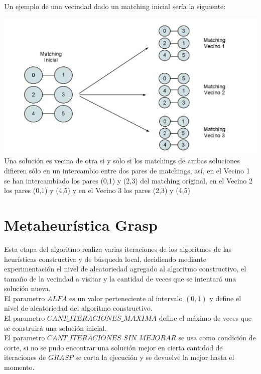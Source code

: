 \documentclass[11pt, a4paper, spanish]{article}
\begin{document}
\newpage
Un ejemplo de una vecindad dado un matching inicial ser\'ia la siguiente:

\begin{center}
\centering \includegraphics[scale=0.30]{img/MatchingVecindad.png}\\
\small{Una soluci\'on es vecina de otra si y solo si los matchings de ambas soluciones difieren s\'olo en un intercambio entre dos pares de matchings, as\'i, en el Vecino 1 se han intercambiado los pares (0,1) y (2,3) del matching original, en el Vecino 2 los pares (0,1) y (4,5) y en el Vecino 3 los pares (2,3) y (4,5)}
\end{center}

\newpage
\section{Metaheur\'istica Grasp}

Esta etapa del algoritmo realiza varias iteraciones de los algoritmos de las heur\'isticas constructiva y de b\'usqueda local, decidiendo mediante experimentaci\'on el nivel de aleatoriedad agregado al algoritmo constructivo, el tama\~{n}o de la vecindad a visitar y la cantidad de veces que se intentar\'a una soluci\'on nueva.\\
\noindent El parametro $ALFA$ es un valor perteneciente al intervalo $(0,1)$ y define el nivel de aleatoriedad del algoritmo constructivo.\\

\noindent El parametro $CANT\_ITERACIONES\_MAXIMA$ define el m\'aximo de veces que se construir\'a una soluci\'on inicial.\\

\noindent El parametro $CANT\_ITERACIONES\_SIN\_MEJORAR$ se usa como condici\'on de corte, si no se pudo encontrar una soluci\'on mejor en cierta cantidad de iteraciones de $GRASP$ se corta la ejecuci\'on y se devuelve la mejor hasta el momento.\\
\end{document}
